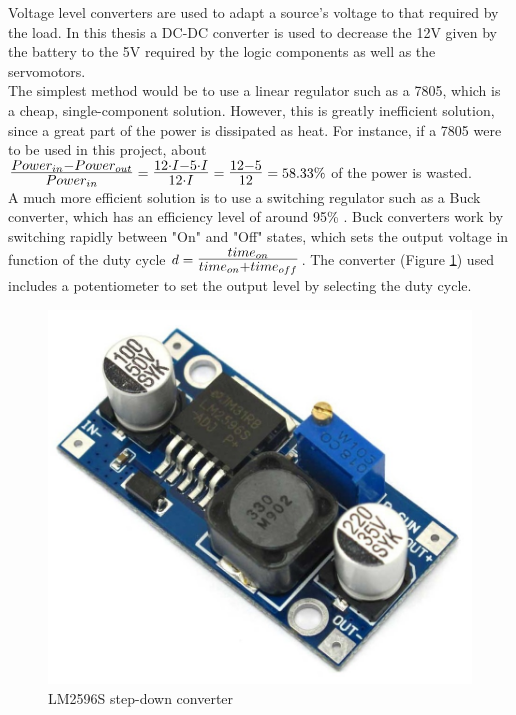 		Voltage level converters are used to adapt a source's voltage to that required by the load. In this thesis a DC-DC converter is used to decrease the 12V given by the battery to the 5V required by the logic components as well as the servomotors. \\
		
		The simplest method would be to use a linear regulator such as a 7805, which is a cheap, single-component solution. However, this is greatly inefficient solution, since a great part of the power is dissipated as heat.
		For instance, if a 7805 were to be used in this project, about $\mbox{\Large $\frac{Power_{in} - Power_{out} }{Power_{in} }$}=\mbox{\Large $\frac{12 \cdot I -5 \cdot I}{12\cdot I}$}=\mbox{\Large $\frac{12-5}{12}$}=58.33\%$ of the power is wasted.\\


		A much more efficient solution is to use a switching regulator such as a Buck converter, which has an efficiency level of around 95\%  \cite{buck}. 
		Buck converters work by switching rapidly between "On" and "Off" states, which sets the output voltage in function of the duty cycle $d=\mbox{\Large $\frac{time_{on}}{time_{on}+time_{off}}$}$. The converter (Figure \ref{step-down}) used includes a potentiometer to set the output level by selecting the duty cycle. 
 
		

			\begin{figure}[H]
					\centering
					\includegraphics[scale=0.2]{images/ProjectComponents/buck.jpg}
					\caption{LM2596S step-down converter }
					\label{step-down}
			\end{figure}
			\bigskip

